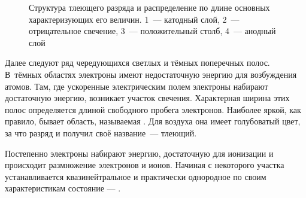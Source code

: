 


\begin{figure}[h!]
	\centering
	\caption{Структура тлеющего разряда и распределение по длине основных 
        характеризующих его величин. 
        1~--- катодный слой,
        2~--- отрицательное свечение,
        3~--- положительный столб,
        4~--- анодный слой
        }
\end{figure}

Далее следуют ряд чередующихся светлых и тёмных поперечных полос. 
В~тёмных областях электроны имеют недостаточную энергию 
для возбуждения атомов. Там, где ускоренные электрическим полем электроны 
набирают достаточную энергию, возникает участок свечения.
Характерная ширина этих полос определяется длиной свободного пробега электронов.
Наиболее яркой, как правило, бывает область,
называемая .
Для воздуха она имеет голубоватый цвет, за что разряд и получил своё 
название~--- тлеющий.

Постепенно электроны набирают энергию, достаточную для ионизации
и происходит размножение электронов и ионов.
Начиная с некоторого участка устанавливается квазинейтральное
и практически однородное по своим характеристикам состояние 
--- .




